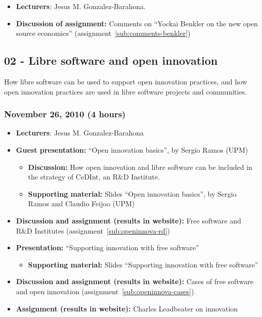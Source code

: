 \documentclass[a4paper]{article}
\begin{document}
\begin{itemize}
 \item \textbf{Lecturers}: Jesus M. Gonzalez-Barahona.
\item \textbf{Discussion of assignment:} Comments on ``Yockai Benkler on the new open source economics'' (assignment~\ref{sub:comments-benkler})
\end{itemize}

\subsection{02 - Libre software and open innovation}

How libre software can be used to support open innovation practices, and how open innovation practices are used in libre software projects and communities.

\subsubsection{November 26, 2010 (4 hours)}

\begin{itemize}
\item \textbf{Lecturers}: Jesus M. Gonzalez-Barahona
\item \textbf{Guest presentation:} ``Open innovation basics'', by Sergio Ramos (UPM)
  \begin{itemize}
  \item \textbf{Discussion:} How open innovation and libre software can be included in the strategy of CeDInt, an R\&D Institute.
  \item \textbf{Supporting material:} Slides ``Open innovation basics'', by Sergio Ramos and Claudio Feijoo (UPM)
  \end{itemize}
\item \textbf{Discussion and assignment (results in website):} Free software and R\&D Institutes (assignment~\ref{sub:openinnova-rd})
\item \textbf{Presentation:} ``Supporting innovation with free software''
  \begin{itemize}
  \item \textbf{Supporting material:} Slides ``Supporting innovation with free software''
  \end{itemize}
\item \textbf{Discussion and assignment (results in website):} Cases of free software and open innovation (assignment~\ref{sub:openinnova-cases})
\item \textbf{Assignment (results in website):} Charles Leadbeater on innovation
\end{itemize}
\end{document}
